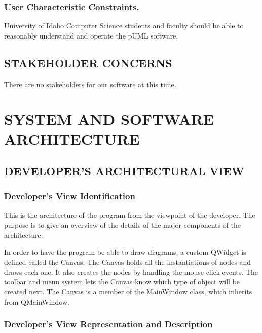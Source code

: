 \documentclass[twoside,letterpaper]{article}
\begin{document}
{\subsubsection{User Characteristic Constraints.}
{
University of Idaho Computer Science students and faculty should be able
to reasonably understand and operate the pUML software.
}

\subsection[STAKEHOLDER CONCERNS]
{\bfseries STAKEHOLDER CONCERNS}
{
There are no stakeholders for our software at this time.
}


\bigskip




\clearpage\setcounter{page}{1}\pagestyle{Convertvi}
\section[SYSTEM AND SOFTWARE
ARCHITECTURE]{\bfseries SYSTEM AND
SOFTWARE ARCHITECTURE}

\subsection[DEVELOPER{\textquoteright}S ARCHITECTURAL
VIEW]{\bfseries
DEVELOPER{\textquoteright}S ARCHITECTURAL VIEW}

\subsubsection[Developer{\textquoteright}s View
Identification]{\bfseries
Developer{\textquoteright}s View Identification}
{
This is the architecture of the program from the viewpoint of the
developer. The purpose is to give an overview of the details of the major
components of the architecture.}

{
In order to have the program be able to draw diagrams, a custom QWidget
is defined called the Canvas. The Canvas holds all the instantiations of
nodes and draws each one. It also creates the nodes by handling the
mouse click events. The toolbar and menu system lets the Canvas know
which type of object will be created next. The Canvas is a member of
the MainWindow class, which inherits from QMainWindow. }

\subsubsection[Developer{\textquoteright}s View Representation and
Description ]{Developer{\textquoteright}s View Representation and
Description }

}
\end{document}
